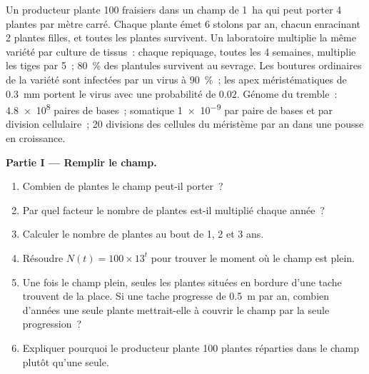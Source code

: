 \begin{problem}
\label{pb:b2:asexual-reproduction:1}
Un producteur plante \num{100} fraisiers dans un champ de \qty{1}{ha}
qui peut porter \num{4} plantes par mètre carré. Chaque plante émet
\num{6} stolons par an, chacun enracinant \num{2} plantes filles, et
toutes les plantes survivent. Un laboratoire multiplie la même variété
par culture de tissus~: chaque repiquage, toutes les \num{4} semaines,
multiplie les tiges par \num{5}~; \qty{80}{\%} des plantules survivent
au sevrage. Les boutures ordinaires de la variété sont infectées par un
virus à \qty{90}{\%}~; les apex méristématiques de \qty{0.3}{mm}
portent le virus avec une probabilité de $0.02$. Génome du tremble~:
\qty{4.8e8}{} paires de bases~;  somatique
\qty{1e-9}{} par paire de bases et par division cellulaire~; \num{20}
divisions des cellules du méristème par an dans une pousse en
croissance.

\medskip
\noindent\textbf{Partie I --- Remplir le champ.}
\begin{enumerate}
  \item Combien de plantes le champ peut-il porter~?
  \item Par quel facteur le nombre de plantes est-il multiplié chaque
        année~?
  \item Calculer le nombre de plantes au bout de 1, 2 et 3 ans.
  \item Résoudre $N(t) = 100\times 13^{t}$ pour trouver le moment où le
        champ est plein.
  \item Une fois le champ plein, seules les plantes situées en bordure
        d'une tache trouvent de la place. Si une tache progresse de
        \qty{0.5}{m} par an, combien d'années une seule plante
        mettrait-elle à couvrir le champ par la seule progression~?
  \item Expliquer pourquoi le producteur plante \num{100} plantes
        réparties dans le champ plutôt qu'une seule.
\end{enumerate}


\end{problem}

